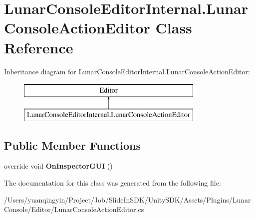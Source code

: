 \hypertarget{class_lunar_console_editor_internal_1_1_lunar_console_action_editor}{}\section{Lunar\+Console\+Editor\+Internal.\+Lunar\+Console\+Action\+Editor Class Reference}
\label{class_lunar_console_editor_internal_1_1_lunar_console_action_editor}
Inheritance diagram for Lunar\+Console\+Editor\+Internal.\+Lunar\+Console\+Action\+Editor\+:\begin{figure}[H]
\begin{center}
\leavevmode
\includegraphics[height=2.000000cm]{class_lunar_console_editor_internal_1_1_lunar_console_action_editor}
\end{center}
\end{figure}
\subsection*{Public Member Functions}
\begin{DoxyCompactItemize}
\item 
\mbox{\label{class_lunar_console_editor_internal_1_1_lunar_console_action_editor_aecfd1aa120da7924e9a6bc5abbec3212}} 
override void {\bfseries On\+Inspector\+G\+UI} ()
\end{DoxyCompactItemize}


The documentation for this class was generated from the following file\+:\begin{DoxyCompactItemize}
\item 
/\+Users/yuanqingyin/\+Project/\+Job/\+Slide\+In\+S\+D\+K/\+Unity\+S\+D\+K/\+Assets/\+Plugins/\+Lunar\+Console/\+Editor/Lunar\+Console\+Action\+Editor.\+cs\end{DoxyCompactItemize}
